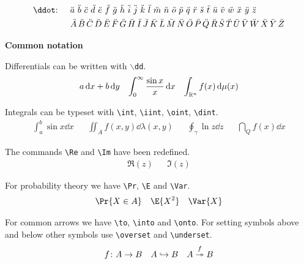 \documentclass{myassignment}
\begin{document}
\begin{align*}
    &\text{\texttt{\textbackslash ddot}: } &&\ddot{a}\,\,\ddot{b}\,\,\ddot{c}\,\,\ddot{d}\,\,\ddot{e}\,\,\ddot{f}\,\,\ddot{g}\,\,\ddot{h}\,\,\ddot{i}\,\,\ddot{j}\,\,\ddot{k}\,\,\ddot{l}\,\,\ddot{m}\,\,\ddot{n}\,\,\ddot{o}\,\,\ddot{p}\,\,\ddot{q}\,\,\ddot{r}\,\,\ddot{s}\,\,\ddot{t}\,\,\ddot{u}\,\,\ddot{v}\,\,\ddot{w}\,\,\ddot{x}\,\,\ddot{y}\,\,\ddot{z} \\
    &&&\ddot{A}\,\ddot{B}\,\ddot{C}\,\ddot{D}\,\ddot{E}\,\ddot{F}\,\ddot{G}\,\ddot{H}\,\ddot{I}\,\ddot{J}\,\ddot{K}\,\ddot{L}\,\ddot{M}\,\ddot{N}\,\ddot{O}\,\ddot{P}\,\ddot{Q}\,\ddot{R}\,\ddot{S}\,\ddot{T}\,\ddot{U}\,\ddot{V}\,\ddot{W}\,\ddot{X}\,\ddot{Y}\,\ddot{Z}
\end{align*}

\newpage

\textbf{Common notation}

Differentials can be written with \texttt{$\backslash$dd}.
\begin{align*}
    a\mathop{}\!\mathrm{d} x + b\mathop{}\!\mathrm{d} y && \int_0^\infty \frac{\sin x}{x} \mathop{}\!\mathrm{d} x && \int_{\mathbb{R}^n} f(x) \mathop{}\!\mathrm{d} \mu(x)
\end{align*}

Integrals can be typeset with \texttt{\textbackslash int}, \texttt{\textbackslash iint}, \texttt{\textbackslash oint}, \texttt{\textbackslash dint}.
\begin{align*}
    \int_a^b \sin x \dd x && \iint_A f(x, y) \dd \lambda(x, y) && \oint_\gamma \ln z \dd z && \dint_Q f(x) \dd x
\end{align*}

The commands \texttt{\textbackslash Re} and \texttt{\textbackslash Im} have been redefined.
\begin{align*}
    \Re(z) && \Im(z)
\end{align*}

For probability theory we have \texttt{\textbackslash Pr}, \texttt{\textbackslash E} and \texttt{\textbackslash Var}.
\begin{align*}
    \Pr{X \in A} && \E{X^2} && \Var{X}
\end{align*}

For common arrows we have \texttt{\textbackslash to}, \texttt{\textbackslash into} and \texttt{\textbackslash onto}. For setting symbols above and below other symbols use \texttt{\textbackslash overset} and \texttt{\textbackslash underset}.
\begin{align*}
    f \colon A \to B && A \hookrightarrow B && A \overset{f}{\twoheadrightarrow} B
\end{align*}
\end{document}
